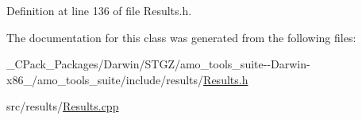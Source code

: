 Definition at line 136 of file Results.\+h.



The documentation for this class was generated from the following files\+:\begin{DoxyCompactItemize}
\item 
\+\_\+\+C\+Pack\+\_\+\+Packages/\+Darwin/\+S\+T\+G\+Z/amo\+\_\+tools\+\_\+suite-\/-\/\+Darwin-\/x86\+\_/amo\+\_\+tools\+\_\+suite/include/results/\hyperlink{___c_pack___packages_2_darwin_2_s_t_g_z_2amo__tools__suite--_darwin-x86__64_2amo__tools__suite_2include_2results_2_results_8h}{Results.\+h}\item 
src/results/\hyperlink{_results_8cpp}{Results.\+cpp}\end{DoxyCompactItemize}
